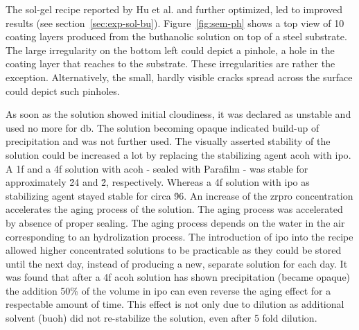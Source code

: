 The sol-gel recipe reported by Hu et al.\cite{Hu2016} and further optimized, led to improved results (see section~\ref{sec:exp-sol-bu}). 
%
Figure~\ref{fig:sem-ph} shows a top view of 10 coating layers produced from  the buthanolic solution on top of a steel substrate. 
The large irregularity on the bottom left could depict a pinhole, a hole in the coating layer that reaches to the substrate. 
These irregularities are rather the exception. 
Alternatively, the small, hardly visible cracks spread across the surface could depict such pinholes. 

As soon as the solution showed initial cloudiness, it was declared as unstable and used no more for \gls{db}. %
The solution becoming opaque indicated build-up of precipitation and was not further used.
The visually asserted stability of the solution could be increased a lot by replacing the stabilizing agent \gls{acoh} with \gls{ipo}.
A \gls{1f} and a \gls{4f} solution with \gls{acoh} - sealed with Parafilm - was stable for approximately \h{24} and \h{2}, respectively.
Whereas a \gls{4f} solution with \gls{ipo} as stabilizing agent stayed stable for circa \h{96}. 
An increase of the \gls{zrpro} concentration accelerates the aging process of the solution.
The aging process was accelerated by absence of proper sealing.
The aging process depends on the water in the air corresponding to an hydrolization process\cite{Hu2016}.
%
The introduction of \gls{ipo} into the recipe allowed higher concentrated solutions to be practicable 
as they could be stored until the next day, instead of producing a new, separate solution for each day.
%
It was found that after a \gls{4f} \gls{acoh} solution has 
shown precipitation (became opaque)
the addition 50\% of the volume in \gls{ipo} can even reverse the aging effect for a respectable amount of time. 
This effect is not only due to dilution as additional solvent (\gls{buoh}) did not re-stabilize the solution, 
even after 5 fold dilution. 

